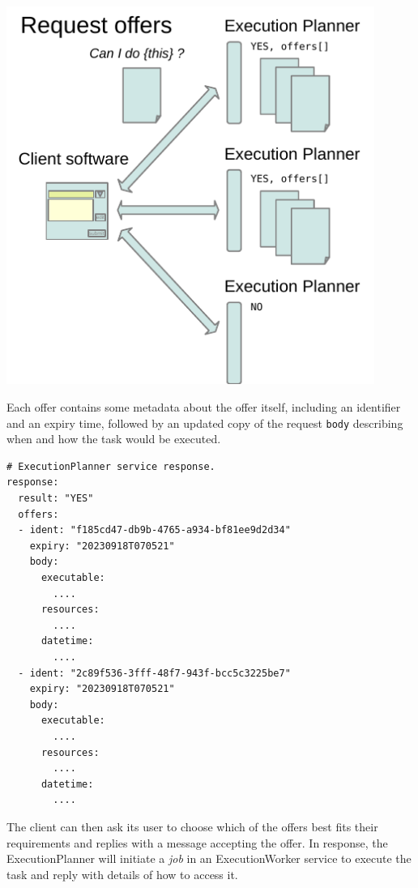 \documentclass[11pt,a4paper]{ivoa}
\newcommand{\execplanner} {ExecutionPlanner}
\newcommand{\execworker} {ExecutionWorker}
\newcommand{\codeword}[1] {\texttt{#1}}
\newcommand{\workerjob} {\textit{job}}
\begin{document}
\includegraphics[width=0.9\textwidth]{diagrams/request-offers.pdf}

Each offer contains some metadata about the offer itself,
including an identifier and an expiry time,
followed by an updated copy of the request \codeword{body}
describing when and how the task would be executed.

\begin{lstlisting}[]
# ExecutionPlanner service response.
response:
  result: "YES"
  offers:
  - ident: "f185cd47-db9b-4765-a934-bf81ee9d2d34"
    expiry: "20230918T070521"
    body:
      executable:
        ....
      resources:
        ....
      datetime:
        ....
  - ident: "2c89f536-3fff-48f7-943f-bcc5c3225be7"
    expiry: "20230918T070521"
    body:
      executable:
        ....
      resources:
        ....
      datetime:
        ....
\end{lstlisting}

The client can then ask its user to choose which of the offers best fits their requirements
and replies with a message accepting the offer.
In response, the \execplanner{} will initiate a \workerjob{} in an \execworker{} service
to execute the task and reply with details of how to access it.

\end{document}

